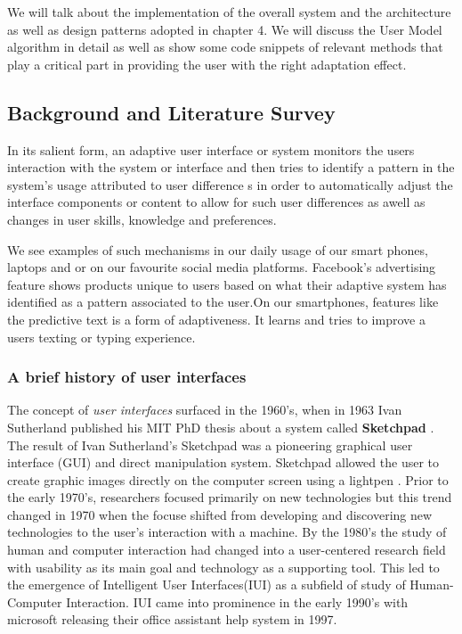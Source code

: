 We will talk about the implementation of the overall system and the architecture as well as design patterns adopted in chapter 4. We will discuss the User Model algorithm in detail as well as show some code snippets of relevant methods that play a critical part in providing the user with the right adaptation effect.


\subsection{Background and Literature Survey} \label{sub:background}
In its salient form, an adaptive user interface or system monitors the users interaction with the system or interface and then tries to identify a pattern in the system's usage attributed to user difference s in order to automatically adjust the interface components or content to allow for such user differences as awell as changes in user skills, knowledge and preferences.

We see examples of such mechanisms in our daily usage of our smart phones, laptops and or on our favourite social media platforms. Facebook's advertising feature shows products unique to users based on what their adaptive system has identified as a pattern associated to the user.On our smartphones, features like the predictive text is a form of adaptiveness. It learns and tries to improve a users texting or typing experience.
\subsubsection{A brief history of user interfaces} \label{sub:history}
The concept of \emph{user interfaces} surfaced in the 1960's, when in 1963 Ivan Sutherland published his MIT PhD thesis about a system called \textbf{Sketchpad} \cite{sutherland1964sketch}.
The result of Ivan Sutherland's Sketchpad was a pioneering graphical user interface (GUI) and direct manipulation system. Sketchpad allowed the user to create graphic images directly on the computer screen using a lightpen \cite{patrick2003intelligent}.
Prior to the early 1970's, researchers focused primarily on new technologies but this trend changed in 1970 when the focuse shifted from developing and discovering new technologies to the user's interaction with a machine.
By the 1980's the study of human and computer interaction had changed into a user-centered research field with usability as its main goal and technology as a supporting tool.\cite{patrick2003intelligent}
This led to the emergence of Intelligent User Interfaces(IUI) as a subfield of study of Human-Computer Interaction. IUI came into prominence in the early 1990's with microsoft releasing their office assistant help system in 1997.
